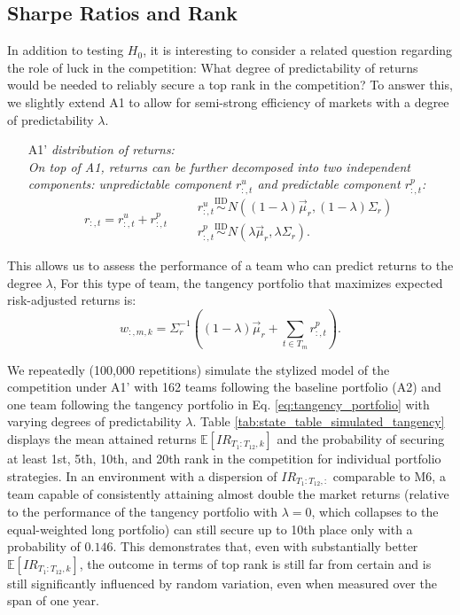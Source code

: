 \documentclass[3p,times,twocolumn]{elsarticle}
\begin{document}
\subsection{Sharpe Ratios and Rank}\label{subsection:IR_and_Rank}

In addition to testing $H_{0}$, it is interesting to consider a related question regarding the role of luck in the competition: What degree of predictability of returns would be needed to reliably secure a top rank in the competition?
To answer this, we slightly extend A1 to allow for semi-strong efficiency of markets with a degree of predictability $\lambda$.
\begin{itemize}
    \item[A1']  \emph{distribution of returns:}\\
        \emph{
            On top of A1, returns can be further decomposed into two independent components: unpredictable component $r_{:,t}^{u}$ and predictable component $r_{:,t}^{p}$:
        }
        \begin{equation}
            r_{:,t}=r_{:,t}^{u}+r_{:,t}^{p} \qquad
            \begin{array}{l}
                r_{:,t}^{u} \overset{\mathrm{IID}}{\sim} N((1-\lambda)\vec{\mu}_{r}, (1-\lambda)\Sigma_{r}) \\
                r_{:,t}^{p} \overset{\mathrm{IID}}{\sim} N(\lambda\vec{\mu}_{r}, \lambda\Sigma_{r}).
            \end{array}
        \end{equation}
\end{itemize}
This allows us to assess the performance of a team who can predict returns to the degree $\lambda$, 
For this type of team, the tangency portfolio that maximizes expected risk-adjusted returns \cite[see e.g.,][]{kourtisSharpeRatioEstimated2016} is:
\begin{equation}\label{eq:tangency_portfolio}
    w_{:,m,k}=\Sigma_{r}^{-1}((1-\lambda) \vec{\mu}_{r} + \sum_{t\in T_{m}}r_{:,t}^{p}).
\end{equation}


We repeatedly (100,000 repetitions) simulate the stylized model of the competition under A1' with 162 teams following the baseline portfolio (A2) and one team following the tangency portfolio in Eq. \ref{eq:tangency_portfolio} with varying degrees of predictability $\lambda$.
Table \ref{tab:state_table_simulated_tangency} displays the mean attained returns $\mathbb{E}[IR_{T_{1}:T_{12},k}]$ and the probability of securing at least 1st, 5th, 10th, and 20th rank in the competition for individual portfolio strategies. 
In an environment with a dispersion of $IR_{T_{1}:T_{12},:}$ comparable to M6, a team capable of consistently attaining almost double the market returns (relative to the performance of the tangency portfolio with $\lambda = 0$, which collapses to the equal-weighted long portfolio) can still secure up to 10th place only with a probability of $0.146$. 
This demonstrates that, even with substantially better $\mathbb{E}[IR_{T_{1}:T_{12},k}]$, the outcome in terms of top rank is still far from certain and is still significantly influenced by random variation, even when measured over the span of one year.
\end{document}
